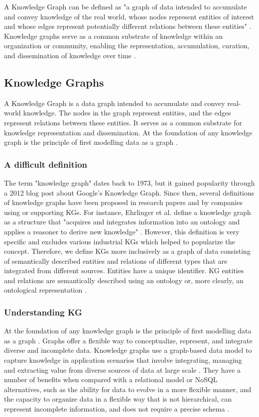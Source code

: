 \documentclass[11pt]{article} %
\begin{document}
A Knowledge Graph can be defined as "a graph of data intended to accumulate and convey knowledge of the real world, whose nodes represent entities of interest and whose edges represent potentially different relations between these entities" \cite[p.3]{KG21}. Knowledge graphs serve as a common substrate of knowledge within an organization or community, enabling the representation, accumulation, curation, and dissemination of knowledge over time \cite[p.31]{KG21}.

\subsection{Knowledge Graphs}
A Knowledge Graph is a data graph intended to accumulate and convey real-world knowledge. The nodes in the graph represent entities, and the edges represent relations between these entities. It serves as a common substrate for knowledge representation and dissemination. At the foundation of any knowledge graph is the principle of first modelling data as a graph \cite[p.4]{KG21}.

\subsubsection*{A difficult definition}
The term "knowledge graph" dates back to 1973, but it gained popularity through a 2012 blog post about Google's Knowledge Graph. Since then, several definitions of knowledge graphs have been proposed in research papers and by companies using or supporting KGs. For instance, Ehrlinger et al. define a knowledge graph as a structure that "acquires and integrates information into an ontology and applies a reasoner to derive new knowledge" \cite{TDKG16}. However, this definition is very specific and excludes various industrial KGs which helped to popularize the concept. Therefore, we define KGs more inclusively as a graph of data consisting of semantically described entities and relations of different types that are integrated from different sources. Entities have a unique identifier. KG entities and relations are semantically described using an ontology or, more clearly, an ontological representation \cite{CKG23}.

\subsubsection*{Understanding KG}
At the foundation of any knowledge graph is the principle of first modelling data as a graph \cite[p.4]{KG21}. Graphs offer a flexible way to conceptualize, represent, and integrate diverse and incomplete data. Knowledge graphs use a graph-based data model to capture knowledge in application scenarios that involve integrating, managing and extracting value from diverse sources of data at large scale \cite[p.2]{KG21}. They have a number of benefits when compared with a relational model or NoSQL alternatives, such as the ability for data to evolve in a more flexible manner, and the capacity to organize data in a flexible way that is not hierarchical, can represent incomplete information, and does not require a precise schema \cite[p.2]{KG21}.
\end{document}
